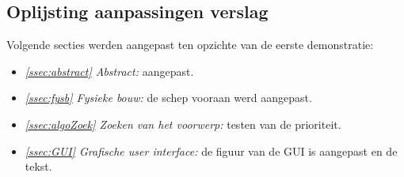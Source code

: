 \documentclass[tt2]{penoverslag}
\begin{document}
\subsection{Oplijsting aanpassingen verslag} %
\label{Assec:aanp1}
Volgende secties werden aangepast ten opzichte van de eerste demonstratie:

\begin{itemize}
\item \textit{\ref{ssec:abstract} Abstract:} aangepast.
\item \textit{\ref{ssec:fysb} Fysieke bouw:} de schep vooraan werd aangepast.
\item \textit{\ref{ssec:algoZoek} Zoeken van het voorwerp:} testen van de prioriteit.
\item \textit{\ref{ssec:GUI} Grafische user interface:} de figuur van de GUI is aangepast en de tekst.


\end{itemize}



%
%
%
%
%
%
%
\end{document}
